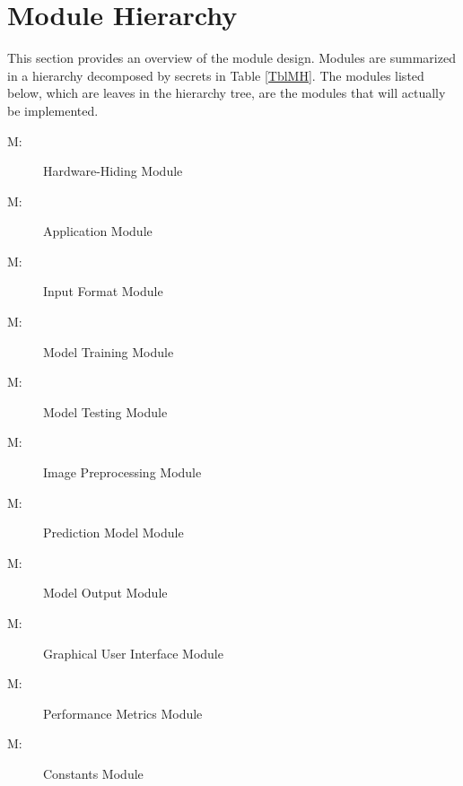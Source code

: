 \documentclass[12pt, titlepage]{article}
\newcounter{mnum}
\newcommand{\mthemnum}{M\themnum}
\begin{document}
\section{Module Hierarchy} \label{SecMH}

This section provides an overview of the module design. Modules are summarized
in a hierarchy decomposed by secrets in Table \ref{TblMH}. The modules listed
below, which are leaves in the hierarchy tree, are the modules that will
actually be implemented.

\begin{description}
\item [ \mthemnum \label{mHH}:] Hardware-Hiding Module
\item [ \mthemnum \label{mApplication}:] Application Module
\item [ \mthemnum \label{mInput}:] Input Format Module
\item [ \mthemnum \label{mTraining}:] Model Training Module
\item [ \mthemnum \label{mTesting}:] Model Testing Module
\item [ \mthemnum \label{mPreprocessing}:] Image Preprocessing Module
\item [ \mthemnum \label{mModel}:] Prediction Model Module
\item [ \mthemnum \label{mOutput}:] Model Output Module
\item [ \mthemnum \label{mGUI}:] Graphical User Interface Module
\item [ \mthemnum \label{mPerformance}:] Performance Metrics Module
\item [ \mthemnum \label{mConstants}:] Constants Module
\end{description}
\end{document}
